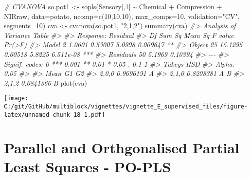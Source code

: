 \documentclass[
]{article}
\newenvironment{Shaded}{\begin{snugshade}}{\end{snugshade}}
\newcommand{\AttributeTok}[1]{\textcolor[rgb]{0.77,0.63,0.00}{#1}}
\newcommand{\CommentTok}[1]{\textcolor[rgb]{0.56,0.35,0.01}{\textit{#1}}}
\newcommand{\DecValTok}[1]{\textcolor[rgb]{0.00,0.00,0.81}{#1}}
\newcommand{\FunctionTok}[1]{\textcolor[rgb]{0.00,0.00,0.00}{#1}}
\newcommand{\NormalTok}[1]{#1}
\newcommand{\OtherTok}[1]{\textcolor[rgb]{0.56,0.35,0.01}{#1}}
\newcommand{\SpecialCharTok}[1]{\textcolor[rgb]{0.00,0.00,0.00}{#1}}
\newcommand{\StringTok}[1]{\textcolor[rgb]{0.31,0.60,0.02}{#1}}
\begin{document}
\begin{Shaded}
\begin{Highlighting}[]
\CommentTok{\# CVANOVA}
\NormalTok{so.pot1 }\OtherTok{\textless{}{-}} \FunctionTok{sopls}\NormalTok{(Sensory[,}\DecValTok{1}\NormalTok{] }\SpecialCharTok{\textasciitilde{}}\NormalTok{ Chemical }\SpecialCharTok{+}\NormalTok{ Compression }\SpecialCharTok{+}\NormalTok{ NIRraw, }\AttributeTok{data=}\NormalTok{potato, }
            \AttributeTok{ncomp=}\FunctionTok{c}\NormalTok{(}\DecValTok{10}\NormalTok{,}\DecValTok{10}\NormalTok{,}\DecValTok{10}\NormalTok{), }\AttributeTok{max\_comps=}\DecValTok{10}\NormalTok{, }\AttributeTok{validation=}\StringTok{"CV"}\NormalTok{, }\AttributeTok{segments=}\DecValTok{10}\NormalTok{)}
\NormalTok{cva }\OtherTok{\textless{}{-}} \FunctionTok{cvanova}\NormalTok{(so.pot1, }\StringTok{"2,1,2"}\NormalTok{)}
\FunctionTok{summary}\NormalTok{(cva)}
\CommentTok{\#\textgreater{} Analysis of Variance Table}
\CommentTok{\#\textgreater{} }
\CommentTok{\#\textgreater{} Response: Residual}
\CommentTok{\#\textgreater{}           Df  Sum Sq Mean Sq F value    Pr(\textgreater{}F)    }
\CommentTok{\#\textgreater{} Model      2  1.0601 0.53007  5.0998  0.009647 ** }
\CommentTok{\#\textgreater{} Object    25 15.1295 0.60518  5.8225 6.511e{-}08 ***}
\CommentTok{\#\textgreater{} Residuals 50  5.1969 0.10394                      }
\CommentTok{\#\textgreater{} {-}{-}{-}}
\CommentTok{\#\textgreater{} Signif. codes:  0 \textquotesingle{}***\textquotesingle{} 0.001 \textquotesingle{}**\textquotesingle{} 0.01 \textquotesingle{}*\textquotesingle{} 0.05 \textquotesingle{}.\textquotesingle{} 0.1 \textquotesingle{} \textquotesingle{} 1}
\CommentTok{\#\textgreater{} Tukey\textquotesingle{}s HSD}
\CommentTok{\#\textgreater{} Alpha: 0.05}
\CommentTok{\#\textgreater{} }
\CommentTok{\#\textgreater{}            Mean G1 G2}
\CommentTok{\#\textgreater{} 2,0,0 0.9696191  A   }
\CommentTok{\#\textgreater{} 2,1,0 0.8208381  A  B}
\CommentTok{\#\textgreater{} 2,1,2 0.6841366     B}
\FunctionTok{plot}\NormalTok{(cva)}
\end{Highlighting}
\end{Shaded}

\texttt{[image: C:/git/GitHub/multiblock/vignettes/vignette\_E\_supervised\_files/figure-latex/unnamed-chunk-18-1.pdf]}

\hypertarget{parallel-and-orthgonalised-partial-least-squares---po-pls}{%
\section{Parallel and Orthgonalised Partial Least Squares -
PO-PLS}\label{parallel-and-orthgonalised-partial-least-squares---po-pls}}
\end{document}
